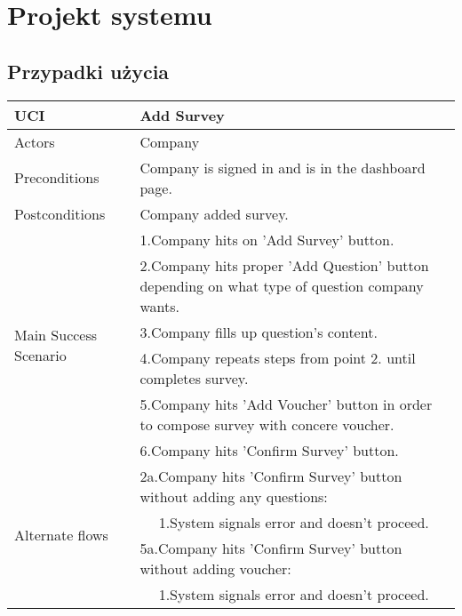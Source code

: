 \chapter{Projekt systemu}

\section{Przypadki użycia}
	\begin{table}[H]
	\centering
	\sffamily\captionsetup{justification=raggedright,singlelinecheck=false,position = below, font = sf}
	\begin{tabular}{|m{3.5cm}|m{11cm}|}
	\hline 
	UCI & Add Survey \\
	\hline
	Actors & Company \\ 
	\hline
	Preconditions & Company is signed in and is in the dashboard page. \\
	\hline
	Postconditions & Company added survey. \\
	\multirow{6}{*}{Main Success Scenario} & 1.Company hits on 'Add Survey' button. \\
	\cline{2-2}
	& 2.Company hits proper 'Add Question' button depending on what type of question company wants. \\
	\cline{2-2}
	& 3.Company fills up question's content. \\
	\cline{2-2}
	& 4.Company repeats steps from point 2. until completes survey. \\
	\cline{2-2}
	& 5.Company hits 'Add Voucher' button in order to compose survey with concere voucher. \\
	\cline{2-2}
	& 6.Company hits 'Confirm Survey' button. \\
	\hline
	\multirow{4}{*}{Alternate flows} & 2a.Company hits 'Confirm Survey' button without adding any questions: \\
	\cline{2-2}
	& \multicolumn{1}{c|}{1.System signals error and doesn't proceed.} \\
	\cline{2-2}
	& 5a.Company hits 'Confirm Survey' button without adding voucher: \\
	\cline{2-2}
	& \multicolumn{1}{c|}{1.System signals error and doesn't proceed.} \\
	\hline	
	\end{tabular}
	\end{table}		
		
